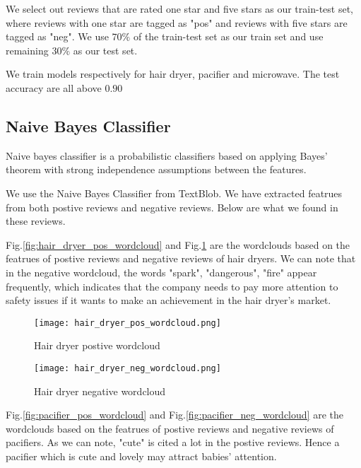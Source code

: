 \documentclass{mcmthesis}
\begin{document}
We select out reviews that are rated one star and five stars as our train-test set, where reviews with one star are tagged as "pos" and reviews with five stars are tagged as "neg". We use $70\%$ of the train-test set as our train set and use remaining $30\%$ as our test set.

We train models respectively for hair dryer, pacifier and microwave. The test accuracy are all above $0.90$


\subsection{Naive Bayes Classifier}


Naive bayes classifier is a probabilistic classifiers 
based on applying Bayes' theorem with strong independence assumptions between the features.

We use the Naive Bayes Classifier from TextBlob. We have extracted featrues from both postive reviews and negative reviews. Below are what we found in these reviews.

Fig.\ref{fig:hair_dryer_pos_wordcloud} and Fig.\ref{fig:hair_dryer_neg_wordcloud} are the wordclouds based on the featrues of postive reviews and negative reviews of hair dryers. We can note that in the negative wordcloud, the words "spark", "dangerous", "fire" appear frequently, which indicates that the company needs to pay more attention to safety issues if it wants to make an achievement in the hair dryer's market. 

\begin{figure}[!h]
\centering
\begin{minipage}[t]{0.48\textwidth}
\centering
\texttt{[image: hair\_dryer\_pos\_wordcloud.png]}
\caption{Hair dryer postive wordcloud}
\label{fig:hair_dryer_pos_wordcloud}
\end{minipage}
\begin{minipage}[t]{0.48\textwidth}
\centering
\texttt{[image: hair\_dryer\_neg\_wordcloud.png]}
\caption{Hair dryer negative wordcloud}
\label{fig:hair_dryer_neg_wordcloud}
\end{minipage}
\end{figure}



Fig.\ref{fig:pacifier_pos_wordcloud} and Fig.\ref{fig:pacifier_neg_wordcloud} are the wordclouds based on the featrues of postive reviews and negative reviews of pacifiers. As we can note, "cute" is cited a lot in the postive reviews. Hence a pacifier which is cute and lovely may attract babies' attention.
\end{document}
